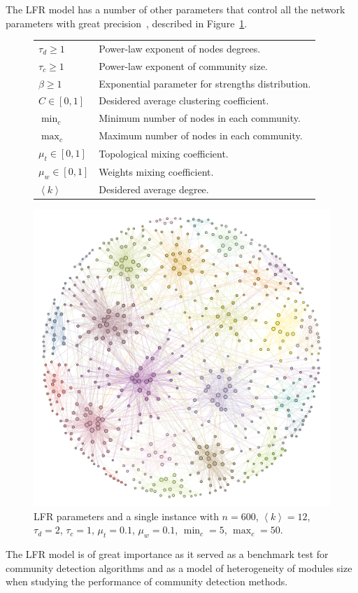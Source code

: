 The LFR model has a number of other parameters that control all the network parameters with great precision~\cite{lancichinetti2008,lancichinetti2009a}, described in Figure~\ref{tab:lfrparams}.
\begin{figure}[htb!]\centering
\begin{footnotesize}
\noindent\begin{minipage}[b!]{0.48\textwidth}
\begin{tabular}{l|p{}}
\hline
$\tau_d \geq 1$ & Power-law exponent of nodes degrees.\\
$\tau_c \geq 1$ & Power-law exponent of community size.\\
$\beta \geq 1$  &Exponential parameter for strengths distribution.\\
$C \in [0,1]$ & Desidered average clustering coefficient.\\
$\min_c$ & Minimum number of nodes in each community.\\
$\max_c$  & Maximum number of nodes in each community.\\
$\mu_t \in [0,1]$ & Topological mixing coefficient.\\
$\mu_w \in [0,1]$ & Weights mixing coefficient.\\
$\left<k\right>$ &Desidered average degree.\\
\hline
\end{tabular}
\end{minipage}\hfill
\begin{minipage}[b!]{0.35\textwidth}\flushright
\includegraphics[width=1\textwidth]{images/LFRexample.pdf}
\end{minipage}
\end{footnotesize}
\caption{LFR parameters and a single instance with $n=600$, $\left<k \right>=12$, $\tau_d=2$, $\tau_c=1$, $\mu_t=0.1$, $\mu_w=0.1$, $\min_c=5$, $\max_c=50$.}
\label{tab:lfrparams}
\end{figure}

The LFR model is of great importance as it served as a benchmark test for community detection algorithms and as a model of heterogeneity of modules size when studying the performance of community detection methods.


